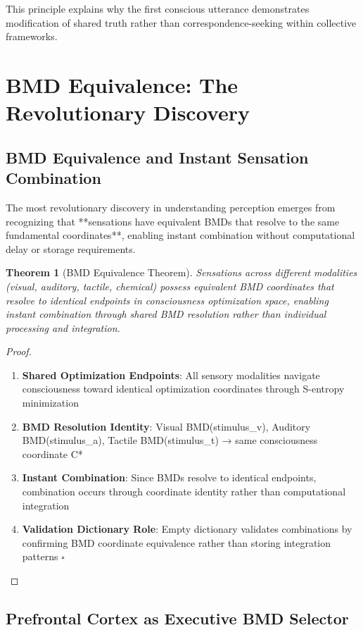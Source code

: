 \documentclass[12pt,a4paper]{article}
\newtheorem{theorem}{Theorem}
\begin{document}
This principle explains why the first conscious utterance demonstrates modification of shared truth rather than correspondence-seeking within collective frameworks.

\section{BMD Equivalence: The Revolutionary Discovery}

\subsection{BMD Equivalence and Instant Sensation Combination}

The most revolutionary discovery in understanding perception emerges from recognizing that **sensations have equivalent BMDs that resolve to the same fundamental coordinates**, enabling instant combination without computational delay or storage requirements.

\begin{theorem}[BMD Equivalence Theorem]
Sensations across different modalities (visual, auditory, tactile, chemical) possess equivalent BMD coordinates that resolve to identical endpoints in consciousness optimization space, enabling instant combination through shared BMD resolution rather than individual processing and integration.
\end{theorem}

\begin{proof}
\begin{enumerate}
\item \textbf{Shared Optimization Endpoints}: All sensory modalities navigate consciousness toward identical optimization coordinates through S-entropy minimization
\item \textbf{BMD Resolution Identity}: Visual BMD(stimulus_v), Auditory BMD(stimulus_a), Tactile BMD(stimulus_t) → same consciousness coordinate C*
\item \textbf{Instant Combination}: Since BMDs resolve to identical endpoints, combination occurs through coordinate identity rather than computational integration
\item \textbf{Validation Dictionary Role}: Empty dictionary validates combinations by confirming BMD coordinate equivalence rather than storing integration patterns $\square$
\end{enumerate}
\end{proof}

\subsection{Prefrontal Cortex as Executive BMD Selector}
\end{document}
